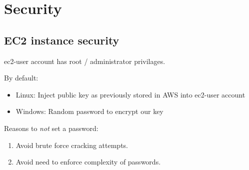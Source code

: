 \chapter{Security}
\label{ch:security}

\section{EC2 instance security}
\label{ec2-instance-security}

ec2-user account has root / administrator privilages.

By default:

\begin{itemize}
\item
  Linux: Inject public key as previously stored in AWS into ec2-user
  account
\item
  Windows: Random password to encrypt our key
\end{itemize}

Reasons to \emph{not} set a password:

\begin{enumerate}
\def\labelenumi{\arabic{enumi}.}
\item
  Avoid brute force cracking attempts.
\item
  Avoid need to enforce complexity of passwords.
\end{enumerate}
